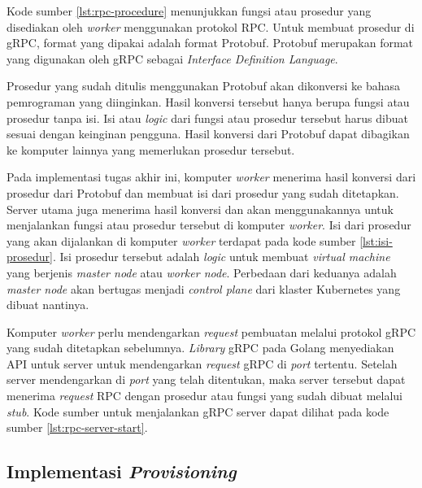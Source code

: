 Kode sumber \ref{lst:rpc-procedure} menunjukkan fungsi atau prosedur
yang disediakan oleh \emph{worker} menggunakan protokol RPC. Untuk membuat prosedur
di gRPC, format yang dipakai adalah format Protobuf. Protobuf merupakan format
yang digunakan oleh gRPC sebagai \emph{Interface Definition Language}.

Prosedur yang sudah ditulis menggunakan Protobuf akan dikonversi
ke bahasa pemrograman yang diinginkan. Hasil konversi tersebut hanya
berupa fungsi atau prosedur tanpa isi. Isi atau \emph{logic} dari fungsi atau prosedur
tersebut harus dibuat sesuai dengan keinginan pengguna. Hasil konversi dari Protobuf
dapat dibagikan ke komputer lainnya yang memerlukan prosedur tersebut. 

Pada implementasi tugas akhir ini, komputer \emph{worker} menerima
hasil konversi dari prosedur dari Protobuf dan membuat isi dari
prosedur yang sudah ditetapkan. Server utama juga menerima hasil konversi
dan akan menggunakannya untuk menjalankan fungsi atau prosedur tersebut di komputer
\emph{worker}. Isi dari prosedur yang akan dijalankan di komputer \emph{worker} terdapat
pada kode sumber \ref{lst:isi-prosedur}. Isi prosedur tersebut adalah \emph{logic}
untuk membuat \emph{virtual machine} yang berjenis \emph{master node} atau \emph{worker node}.
Perbedaan dari keduanya adalah \emph{master node} akan bertugas menjadi \emph{control plane}
dari klaster Kubernetes yang dibuat nantinya.

\clearpage



Komputer \emph{worker} perlu mendengarkan \emph{request} pembuatan melalui
protokol gRPC yang sudah ditetapkan sebelumnya. \emph{Library} gRPC pada Golang
menyediakan API untuk server untuk mendengarkan \emph{request} gRPC di \emph{port}
tertentu. Setelah server mendengarkan di \emph{port} yang telah ditentukan, maka
server tersebut dapat menerima \emph{request} RPC dengan prosedur atau fungsi
yang sudah dibuat melalui \emph{stub}. Kode sumber untuk menjalankan
gRPC server dapat dilihat pada kode sumber \ref{lst:rpc-server-start}.



\subsection{Implementasi \emph{Provisioning}}
\label{sec:provisioning}

